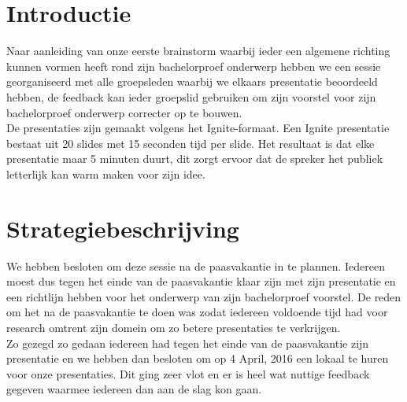 \documentclass[fleqn,10pt]{voorstel}
\begin{document}
\flushbottom %

\maketitle %

\tableofcontents %

\thispagestyle{empty} %


\section{Introductie} %
Naar aanleiding van onze eerste brainstorm waarbij ieder een algemene richting kunnen vormen heeft rond zijn bachelorproef onderwerp hebben we een sessie georganiseerd met alle groepsleden waarbij we elkaars presentatie beoordeeld hebben, de feedback kan ieder groepslid gebruiken om zijn voorstel voor zijn bachelorproef onderwerp correcter op te bouwen.\\
De presentaties zijn gemaakt volgens het Ignite-formaat. Een Ignite presentatie bestaat uit 20 slides met 15 seconden tijd per slide. Het resultaat is dat elke presentatie maar 5 minuten duurt, dit zorgt ervoor dat de spreker het publiek letterlijk kan warm maken voor zijn idee.

\section{Strategiebeschrijving}
We hebben besloten om deze sessie na de paasvakantie in te plannen. Iedereen moest dus tegen het einde van de paasvakantie klaar zijn met zijn presentatie en een richtlijn hebben voor het onderwerp van zijn bachelorproef voorstel. De reden om het na de paasvakantie te doen was zodat iedereen voldoende tijd had voor research omtrent zijn domein om zo betere presentaties te verkrijgen.\\
Zo gezegd zo gedaan iedereen had tegen het einde van de paasvakantie zijn presentatie en we hebben dan besloten om op 4 April, 2016 een lokaal te huren voor onze presentaties. Dit ging zeer vlot en er is heel wat nuttige feedback gegeven waarmee iedereen dan aan de slag kon gaan.
\end{document}
